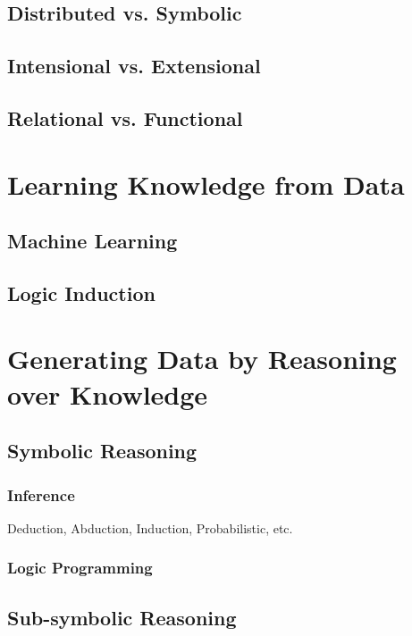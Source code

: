 \documentclass[12pt,a4paper,openright,twoside]{book}
\begin{document}
\section{Distributed vs. Symbolic}

\section{Intensional vs. Extensional}

\section{Relational vs. Functional}

\chapter{Learning Knowledge from Data}

\section{Machine Learning}

\section{Logic Induction}

\chapter{Generating Data by Reasoning over Knowledge}

\section{Symbolic Reasoning}

\subsection{Inference}

Deduction, Abduction, Induction, Probabilistic, etc.

\subsection{Logic Programming}

\section{Sub-symbolic Reasoning}
\end{document}
